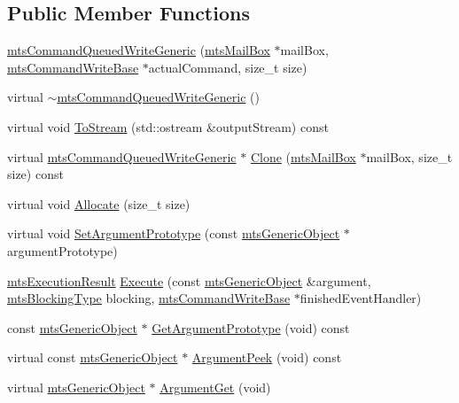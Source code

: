\subsection*{Public Member Functions}
\begin{DoxyCompactItemize}
\item 
\hyperlink{classmts_command_queued_write_generic_aaafdcc6e3828ed2308806cd33da98c58}{mts\+Command\+Queued\+Write\+Generic} (\hyperlink{classmts_mail_box}{mts\+Mail\+Box} $\ast$mail\+Box, \hyperlink{classmts_command_write_base}{mts\+Command\+Write\+Base} $\ast$actual\+Command, size\+\_\+t size)
\item 
virtual \hyperlink{classmts_command_queued_write_generic_af6ee1d684b4a16823d61a85cd619c900}{$\sim$mts\+Command\+Queued\+Write\+Generic} ()
\item 
virtual void \hyperlink{classmts_command_queued_write_generic_a08ecb69cf7b48addc3ac1c2c00749862}{To\+Stream} (std\+::ostream \&output\+Stream) const 
\item 
virtual \hyperlink{classmts_command_queued_write_generic}{mts\+Command\+Queued\+Write\+Generic} $\ast$ \hyperlink{classmts_command_queued_write_generic_a19ab52abd7a5763ca948dfedb561956b}{Clone} (\hyperlink{classmts_mail_box}{mts\+Mail\+Box} $\ast$mail\+Box, size\+\_\+t size) const 
\item 
virtual void \hyperlink{classmts_command_queued_write_generic_a126f75b549a510e4ec11a5f2e48b570d}{Allocate} (size\+\_\+t size)
\item 
virtual void \hyperlink{classmts_command_queued_write_generic_a49574e06b777c7122675adb3022993ef}{Set\+Argument\+Prototype} (const \hyperlink{classmts_generic_object}{mts\+Generic\+Object} $\ast$argument\+Prototype)
\item 
\hyperlink{classmts_execution_result}{mts\+Execution\+Result} \hyperlink{classmts_command_queued_write_generic_ac80ac62ca14d0714e1090305e189d13d}{Execute} (const \hyperlink{classmts_generic_object}{mts\+Generic\+Object} \&argument, \hyperlink{mts_forward_declarations_8h_ad7426ccb6c883bc780d0ee197dddcbe7}{mts\+Blocking\+Type} blocking, \hyperlink{classmts_command_write_base}{mts\+Command\+Write\+Base} $\ast$finished\+Event\+Handler)
\item 
const \hyperlink{classmts_generic_object}{mts\+Generic\+Object} $\ast$ \hyperlink{classmts_command_queued_write_generic_a0213856735a304c121713cfa32e90f70}{Get\+Argument\+Prototype} (void) const 
\item 
virtual const \hyperlink{classmts_generic_object}{mts\+Generic\+Object} $\ast$ \hyperlink{classmts_command_queued_write_generic_a1a165e04b368372046169d786335588f}{Argument\+Peek} (void) const 
\item 
virtual \hyperlink{classmts_generic_object}{mts\+Generic\+Object} $\ast$ \hyperlink{classmts_command_queued_write_generic_adb83e8e295b8fca5b5d998fcc123083d}{Argument\+Get} (void)
\end{DoxyCompactItemize}
